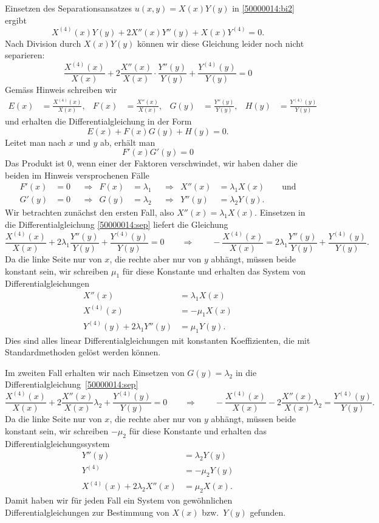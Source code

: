 \begin{loesung}
Einsetzen des Separationsansatzes $u(x,y)=X(x)Y(y)$ in 
\eqref{50000014:bi2} ergibt
\[
X^{(4)}(x)Y(y) + 2X''(x) Y''(y) + X(x)Y^{(4)}=0.
\]
Nach Division durch $X(x)Y(y)$ können wir diese Gleichung leider noch
nicht separieren:
\begin{equation}
\frac{X^{(4)}(x)}{X(x)}
+
2\frac{X''(x)}{X(x)}\cdot \frac{Y''(y)}{Y(y)}
+
\frac{Y^{(4)}(y)}{Y(y)}
=
0
\label{50000014:sep}
\end{equation}
Gemäss Hinweis schreiben wir
\begin{align*}
E(x)&=\frac{X^{(4)}(x)}{X(x)},
&
F(x)&=\frac{X''(x)}{X(x)},
&
G(y)&=\frac{Y''(y)}{Y(y)},
&
H(y)&=\frac{Y^{(4)}(y)}{Y(y)}
\end{align*}
und erhalten die Differentialgleichung in der Form
\[
E(x) + F(x) G(y) + H(y) = 0.
\]
Leitet man nach $x$ und $y$ ab, erhält man
\[
F'(x) G'(y)=0
\]
Das Produkt ist $0$, wenn einer der Faktoren verschwindet, wir haben
daher die beiden im Hinweis versprochenen Fälle 
\[
\begin{aligned}
F'(x)&=0&&\Rightarrow& F(x)&=\lambda_1&&\Rightarrow& X''(x)&=\lambda_1 X(x)
\qquad\text{und}
\\
G'(y)&=0&&\Rightarrow& G(y)&=\lambda_2&&\Rightarrow& Y''(y)&=\lambda_2 Y(y).
\end{aligned}
\]
Wir betrachten zunächst den ersten Fall, also $X''(x)=\lambda_1 X(x)$.
Einsetzen in die Differentialgleichung \eqref{50000014:sep} liefert
die Gleichung
\[
\frac{X^{(4)}(x)}{X(x)}
+
2\lambda_1\frac{Y''(y)}{Y(y)}
+
\frac{Y^{(4)}(y)}{Y(y)}
=0
\qquad\Rightarrow\qquad
-\frac{X^{(4)}(x)}{X(x)}
=
2\lambda_1\frac{Y''(y)}{Y(y)}
+
\frac{Y^{(4)}(y)}{Y(y)}.
\]
Da die linke Seite nur von $x$, die rechte aber nur von $y$ abhängt, müssen
beide konstant sein, wir schreiben $\mu_1$ für diese Konstante und
erhalten das System von Differentialgleichungen
\begin{align*}
X''(x)&=\lambda_1 X(x)
\\
X^{(4)}(x)&=-\mu_1 X(x)
\\
Y^{(4)}(y)
+
2\lambda_1 Y''(y)
&=
\mu_1 Y(y).
\end{align*}
Dies sind alles linear Differentialgleichungen mit konstanten Koeffizienten,
die mit Standardmethoden gelöst werden können.

Im zweiten Fall erhalten wir nach Einsetzen von $G(y)=\lambda_2$ in
die Differentialgleichung~\eqref{50000014:sep}
\[
\frac{X^{(4)}(x)}{X(x)}
+
2\frac{X''(x)}{X(x)}\lambda_2
+
\frac{Y^{(4)}(y)}{Y(y)}
=0
\qquad\Rightarrow\qquad
-\frac{X^{(4)}(x)}{X(x)}
-
2\frac{X''(x)}{X(x)}\lambda_2
=
\frac{Y^{(4)}(y)}{Y(y)}.
\]
Da die linke Seite nur von $x$, die rechte aber nur von $y$ abhängt, müssen
beide konstant sein, wir schreiben $-\mu_2$ für diese Konstante und erhalten
das Differentialgleichungssystem
\begin{align*}
Y''(y)&=\lambda_2 Y(y)
\\
Y^{(4)}&=-\mu_2 Y(y)
\\
X^{(4)}(x) + 2\lambda_2 X''(x) &= \mu_2 X(x).
\end{align*}
Damit haben wir für jeden Fall ein System von gewöhnlichen
Differentialgleichungen zur Bestimmung von $X(x)$ bzw.~$Y(y)$
gefunden.
\end{loesung}

